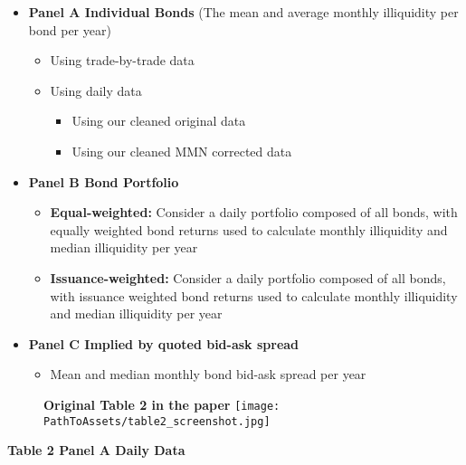 \documentclass{article}
\newcommand*{\PathToAssets}{../assets}%
\begin{document}
\begin{itemize}
    \item \textbf{Panel A Individual Bonds} (The mean and average monthly illiquidity per bond per year)
    \begin{itemize}
        \item Using trade-by-trade data
        \item Using daily data
        \begin{itemize}
            \item Using our cleaned original data
            \item Using our cleaned MMN corrected data
        \end{itemize}
    \end{itemize}
    
    \item \textbf{Panel B Bond Portfolio}
    \begin{itemize}
        \item \textbf{Equal-weighted:} Consider a daily portfolio composed of all bonds, with equally weighted bond returns used to calculate monthly illiquidity and median illiquidity per year
        \item \textbf{Issuance-weighted:} Consider a daily portfolio composed of all bonds, with issuance weighted bond returns used to calculate monthly illiquidity and median illiquidity per year
    \end{itemize}
    
    \item \textbf{Panel C Implied by quoted bid-ask spread}
    \begin{itemize}
        \item Mean and median monthly bond bid-ask spread per year
    \end{itemize}
\end{itemize}


\begin{figure}[hbt!]
\centering
\textbf{\large Original Table 2 in the paper}
\texttt{[image: \\PathToAssets/table2\_screenshot.jpg]}
\end{figure}

\textbf{\large Table 2 Panel A Daily Data}
\end{document}
